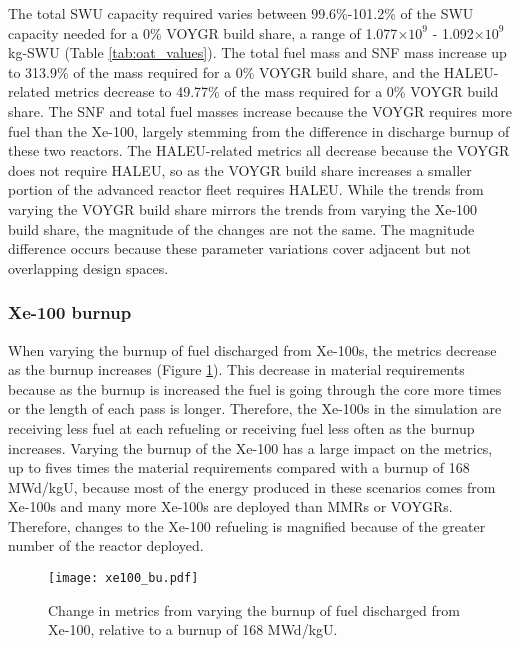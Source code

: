 The total \gls{SWU} capacity required varies between 99.6\%-101.2\% of the 
\gls{SWU} capacity needed for a 0\% VOYGR build share, a range of 1.077$\times 10^9$
- 1.092$\times 10^9$ kg-SWU (Table \ref{tab:oat_values}). The total fuel mass 
and \gls{SNF} mass increase 
up to 313.9\% of the mass required for a 0\% VOYGR build share, and the 
\gls{HALEU}-related metrics decrease to 49.77\% of the mass required 
for a 0\% VOYGR build share. The \gls{SNF} and total fuel masses increase 
because the VOYGR requires more fuel than the Xe-100, largely stemming from 
the difference in discharge burnup of these two reactors. The \gls{HALEU}-related 
metrics all decrease because the VOYGR does not require \gls{HALEU}, so as the 
VOYGR build share increases a smaller portion of the advanced reactor fleet 
requires \gls{HALEU}. While the trends from varying the VOYGR build share 
mirrors the trends from varying the Xe-100 build share, the magnitude of the 
changes are not the same. The magnitude difference occurs because these 
parameter variations cover adjacent but not overlapping design spaces. 

\subsubsection{Xe-100 burnup}
When varying the burnup of fuel discharged from Xe-100s, the metrics decrease 
as the burnup increases (Figure \ref{fig:xe100_bu_s7}). This decrease in material requirements because as 
the burnup is increased the fuel is going through the core more times or the 
length of each pass is longer. Therefore, the Xe-100s in the simulation are receiving 
less fuel at each refueling or receiving fuel less often as the burnup increases. 
Varying the burnup of the Xe-100 has a large impact on the metrics, up to fives times 
the material requirements compared with a burnup of 168 MWd/kgU, because most of 
the energy produced in these scenarios comes from Xe-100s and many more Xe-100s are 
deployed than \glspl{MMR} or VOYGRs. Therefore, changes to the Xe-100 refueling is 
magnified because of the greater number of the reactor deployed. 

\begin{figure}
    \centering
    \texttt{[image: xe100\_bu.pdf]}
    \caption{Change in metrics from varying the burnup of fuel 
    discharged from Xe-100, relative to a burnup of 168 MWd/kgU.}
    \label{fig:xe100_bu_s7}
\end{figure}


